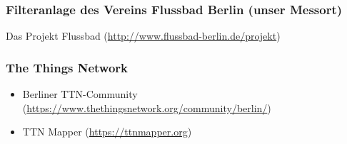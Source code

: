 \subsubsection*{Filteranlage des Vereins Flussbad Berlin (unser Messort)}
	\item Das Projekt Flussbad (\url{http://www.flussbad-berlin.de/projekt})

\subsubsection*{The Things Network}
\begin{itemize}[noitemsep]
	\item Berliner TTN-Community (\url{https://www.thethingsnetwork.org/community/berlin/})
	\item TTN Mapper (\url{https://ttnmapper.org})
\end{itemize}

\newpage
